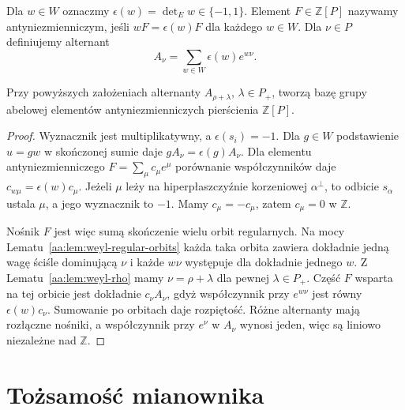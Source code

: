 \begin{definicja}
\label{aa:def:weyl-alternant}
Dla $w\in W$ oznaczmy $\epsilon(w)=\det_E w\in\{-1,1\}$. Element $F\in\mathbb Z[P]$ nazywamy antyniezmienniczym, jeśli $wF=\epsilon(w)F$ dla każdego $w\in W$. Dla $\nu\in P$ definiujemy alternant
\[
 A_\nu=\sum_{w\in W}\epsilon(w)e^{w\nu}.
\]
\end{definicja}

\begin{twierdzenie}
\label{aa:tw:weyl-alternant-basis}
Przy powyższych założeniach alternanty $A_{\rho+\lambda}$, $\lambda\in P_+$, tworzą bazę grupy abelowej elementów antyniezmienniczych pierścienia $\mathbb Z[P]$.
\end{twierdzenie}
\begin{proof}
Wyznacznik jest multiplikatywny, a $\epsilon(s_i)=-1$. Dla $g\in W$ podstawienie $u=gw$ w skończonej sumie daje $gA_\nu=\epsilon(g)A_\nu$. Dla elementu antyniezmienniczego $F=\sum_\mu c_\mu e^\mu$ porównanie współczynników daje $c_{w\mu}=\epsilon(w)c_\mu$. Jeżeli $\mu$ leży na hiperpłaszczyźnie korzeniowej $\alpha^\perp$, to odbicie $s_\alpha$ ustala $\mu$, a jego wyznacznik to $-1$. Mamy $c_\mu=-c_\mu$, zatem $c_\mu=0$ w $\mathbb Z$.

Nośnik $F$ jest więc sumą skończenie wielu orbit regularnych. Na mocy Lematu~\ref{aa:lem:weyl-regular-orbits} każda taka orbita zawiera dokładnie jedną wagę ściśle dominującą $\nu$ i każde $w\nu$ występuje dla dokładnie jednego $w$. Z Lematu~\ref{aa:lem:weyl-rho} mamy $\nu=\rho+\lambda$ dla pewnej $\lambda\in P_+$. Część $F$ wsparta na tej orbicie jest dokładnie $c_\nu A_\nu$, gdyż współczynnik przy $e^{w\nu}$ jest równy $\epsilon(w)c_\nu$. Sumowanie po orbitach daje rozpiętość. Różne alternanty mają rozłączne nośniki, a współczynnik przy $e^\nu$ w $A_\nu$ wynosi jeden, więc są liniowo niezależne nad $\mathbb Z$.
\end{proof}

\section{Tożsamość mianownika}

